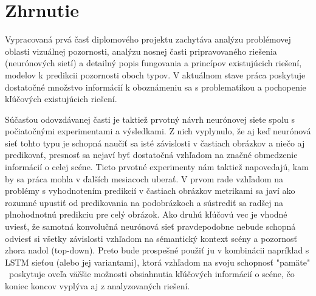 
\newpage
\section{Zhrnutie}

Vypracovaná prvá časť diplomového projektu zachytáva analýzu problémovej oblasti vizuálnej pozornosti, analýzu nosnej časti pripravovaného riešenia (neurónových sietí) a detailný popis fungovania a princípov existujúcich riešení, modelov k predikcii pozornosti oboch typov. V aktuálnom stave práca poskytuje dostatočné množstvo informácií k oboznámeniu sa s problematikou a pochopenie kľúčových existujúcich riešení. 

Súčasťou odovzdávanej časti je taktiež prvotný návrh neurónovej siete spolu s počiatočnými experimentami a výsledkami. Z nich vyplynulo, že aj keď neurónová sieť tohto typu je schopná naučiť sa isté závislosti v častiach obrázkov a niečo aj predikovať, presnosť sa nejaví byť dostatočná vzhľadom na značné obmedzenie informácií o celej scéne. Tieto prvotné experimenty nám taktiež napovedajú, kam by sa práca mohla v ďalších mesiacoch uberať. V prvom rade vzhľadom na problémy s vyhodnotením predikcií v častiach obrázkov metrikami sa javí ako rozumné upustiť od predikovania na podobrázkoch a sústrediť sa radšej na plnohodnotnú predikciu pre celý obrázok. Ako druhú kľúčovú vec je vhodné uviesť, že samotná konvolučná neurónová sieť pravdepodobne nebude schopná odviesť si všetky závislosti vzhľadom na sémantický kontext scény a pozornosť zhora nadol (top-down). Preto bude prospešné použiť ju v kombinácii napríklad s LSTM sieťou (alebo jej variantami), ktorá vzhľadom na svoju schopnosť "pamäte" \ poskytuje oveľa väčšie možnosti obsiahnutia kľúčových informácií o scéne, čo koniec koncov vyplýva aj z analyzovaných riešení.
\newpage
\null
\thispagestyle{empty}
\newpage